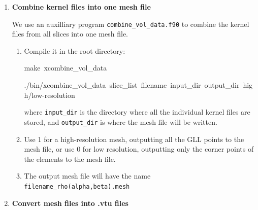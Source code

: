 \begin{enumerate}
After obtaining the slice files, you can collect the corresponding
kernel files from the given slices.
\begin{enumerate}
\item You can use or modify the script \texttt{utils/copy\_basin\_database.pl}
to accomplish this:

\begin{lyxcode}
{\small utils/copy\_database.pl~slice\_file~lsf\_machine\_file~filename~{[}jobid{]}}{\small \par}
\end{lyxcode}

where \texttt{\small lsf\_machine\_file}{\small{} is the machine file
generated by the LSF scheduler, }\texttt{\small filename}{\small{}
is the kernel name (e.g., }\texttt{\small rho\_kernel}{\small , }\texttt{\small alpha\_kernel}{\small{}
and }\texttt{\small beta\_kernel}{\small ), and the optional }\texttt{\small jobid}{\small{}
is the name of the subdirectory under }\texttt{\small LOCAL\_PATH}{\small{}
where all the kernel files are stored.}{\small \par}

\item After executing this script, all the necessary mesh topology files
as well as the kernel array files are collected to the local directory
of the front end.
\end{enumerate}
\item \textbf{Combine kernel files into one mesh file}


We use an auxilliary program \texttt{combine\_vol\_data.f90} to combine
the kernel files from all slices into one mesh file.
\begin{enumerate}
\item Compile it in the root directory:

\begin{lyxcode}
{\footnotesize make~xcombine\_vol\_data~}{\footnotesize \par}

{\footnotesize ./bin/xcombine\_vol\_data~slice\_list~filename~input\_dir~output\_dir~high/low-resolution~}{\footnotesize \par}
\end{lyxcode}

where \texttt{input\_dir} is the directory where all the individual
kernel files are stored, and \texttt{output\_dir} is where the mesh
file will be written.

\item Use 1 for a high-resolution mesh, outputting all the GLL points to
the mesh file, or use 0 for low resolution, outputting only the corner
points of the elements to the mesh file.
\item The output mesh file will have the name \texttt{filename\_rho(alpha,beta).mesh}
\end{enumerate}
\item \textbf{Convert mesh files into .vtu files}


\end{enumerate}
